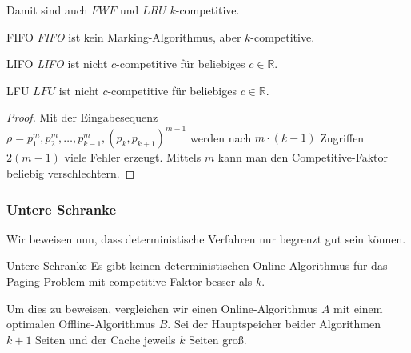 \documentclass{panikzettel}
\begin{document}
Damit sind auch $FWF$ und $LRU$ $k$-competitive.

\begin{halfboxl}
\vspace{-\baselineskip}
    \begin{theo}{FIFO}
        \textit{FIFO} ist kein Marking-Algorithmus, aber $k$-competitive.
    \end{theo}
\end{halfboxl}%
\begin{halfboxr}
\vspace{-\baselineskip}
    \begin{theo}{LIFO}
        \textit{LIFO} ist nicht $c$-competitive für beliebiges $c \in \mathbb{R}$.
    \end{theo}
\end{halfboxr}

\begin{halfboxl}
\vspace{-\baselineskip}
    \begin{theo}{LFU}
        $LFU$ ist nicht $c$-competitive für beliebiges $c \in \mathbb{R}$.
    \end{theo}
\end{halfboxl}%
\begin{halfboxr}
    \vspace{-\baselineskip}
    \begin{proof}
    Mit der Eingabesequenz \\$\rho=p_1^{m},p_2^{m},\dots,p_{k-1}^{m},(p_k,p_{k+1})^{m-1}$ werden nach $m \cdot (k-1)$ Zugriffen $2(m-1)$ viele Fehler erzeugt. Mittels $m$ kann man den Competitive-Faktor beliebig verschlechtern.
    \end{proof}
\end{halfboxr}

\subsubsection{Untere Schranke}
Wir beweisen nun, dass deterministische Verfahren nur begrenzt gut sein können.

\begin{theo}{Untere Schranke}
    Es gibt keinen deterministischen Online-Algorithmus für das Paging-Problem mit competitive-Faktor besser als $k$.
\end{theo}

Um dies zu beweisen, vergleichen wir einen Online-Algorithmus $A$ mit einem optimalen Offline-Algorithmus $B$. Sei der Hauptspeicher beider Algorithmen $k+1$ Seiten und der Cache jeweils $k$ Seiten groß.
\end{document}
